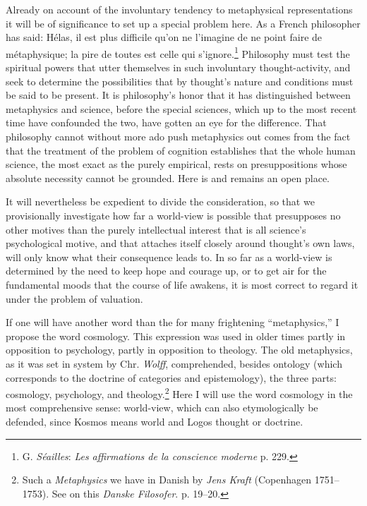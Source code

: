 \documentclass[12pt,a4paper]{book}
\newcommand{\opage}[1]{\marginnote{\footnotesize\textit{[#1]}}}
\begin{document}
Already on account of the involuntary tendency to \opage{308}metaphysical representations it will be
of significance to set up a special problem here. As a French philosopher has said: Hélas,
il est plus difficile qu'on ne l'imagine de ne point faire de métaphysique; la pire de
toutes est celle qui s'ignore.\footnote{G. \emph{Séailles}: \emph{Les affirmations de la
conscience moderne} p. 229.} Philosophy must test the spiritual powers that utter
themselves in such involuntary thought-activity, and seek to determine the possibilities
that by thought's nature and conditions must be said to be present. It is philosophy's
honor that it has distinguished between metaphysics and science, before the special
sciences, which up to the most recent time have confounded the two, have gotten an eye for
the difference. That philosophy cannot without more ado push metaphysics out comes from the
fact that the treatment of the problem of cognition establishes that the whole human
science, the most exact as the purely empirical, rests on presuppositions whose absolute
necessity cannot be grounded. Here is and remains an open place.

It will nevertheless be expedient to divide the consideration, so that we provisionally
investigate how far a world-view is possible that presupposes no other motives than the
purely intellectual interest that is all science's psychological motive, and that attaches
itself closely around thought's own laws, will only know what their consequence leads to.
In so far as a world-view is determined by the need to keep hope and courage up, or to get
air for the fundamental moods that the course of life awakens, it is most correct to regard
it under the problem of valuation.

If one will have another word than the for many frightening ``metaphysics,'' I propose the
word cosmology. This expression was used in older times partly in opposition to psychology,
partly in opposition to theology. The old metaphysics, as it was set in system by Chr.
\emph{Wolff}, comprehended, besides ontology (which corresponds to the doctrine of
categories and epistemology), the three parts: cosmology, psychology, and
theology.\footnote{Such a \emph{Metaphysics} we have in Danish by \emph{Jens Kraft}
(Copenhagen 1751--1753). See on this \emph{Danske Filosofer}. p. 19--20.} Here I will use
the word cosmology in the most comprehensive sense: world-view, which can also
\opage{309}etymologically be defended, since Kosmos means world and Logos thought or doctrine.
\end{document}
